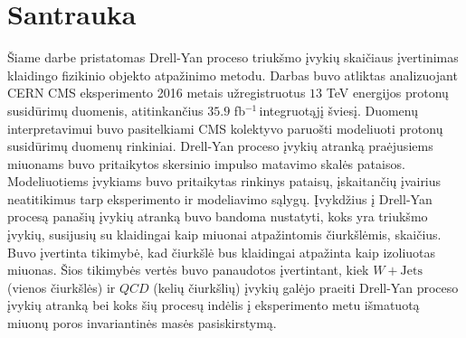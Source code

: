 \documentclass[a4paper, 12pt, oneside]{article}
\newcommand{\WJets}{W\! +\!\mathrm{Jets}}
\newcommand{\invfb}{fb$^{-1}\,$}
\newcommand{\QCD}{QC\! D}
\begin{document}
\section*{Santrauka}
Šiame darbe pristatomas Drell-Yan proceso triukšmo įvykių skaičiaus įvertinimas klaidingo fizikinio objekto
atpažinimo metodu.
Darbas buvo atliktas analizuojant CERN CMS eksperimento 2016 metais užregistruotus
$13$ TeV energijos protonų susidūrimų duomenis, atitinkančius $35.9$ \invfb integruotąjį šviesį.
Duomenų interpretavimui buvo pasitelkiami CMS kolektyvo paruošti modeliuoti protonų susidūrimų duomenų rinkiniai.
Drell-Yan proceso įvykių atranką praėjusiems miuonams buvo pritaikytos skersinio impulso matavimo skalės pataisos.
Modeliuotiems įvykiams buvo pritaikytas rinkinys pataisų, įskaitančių įvairius neatitikimus tarp eksperimento
ir modeliavimo sąlygų.
Įvykdžius į Drell-Yan procesą panašių įvykių atranką buvo bandoma nustatyti, koks yra triukšmo įvykių, susijusių
su klaidingai kaip miuonai atpažintomis čiurkšlėmis, skaičius.
Buvo įvertinta tikimybė, kad čiurkšlė bus klaidingai atpažinta kaip izoliuotas miuonas.
Šios tikimybės vertės buvo panaudotos įvertintant, kiek $\WJets$ (vienos čiurkšlės) ir $\QCD$ (kelių čiurkšlių)
įvykių galėjo praeiti Drell-Yan proceso įvykių atranką bei koks šių procesų indėlis į eksperimento metu
išmatuotą miuonų poros invariantinės masės pasiskirstymą.




\end{document}
